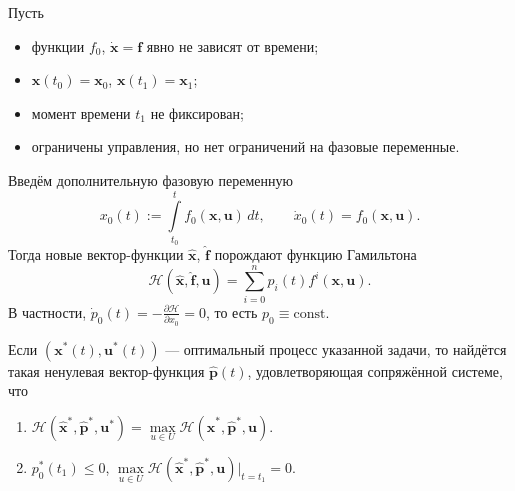 Пусть 
\begin{itemize}[label=--]
  \item функции $ f_0 $, $ \dot{\mathbf{x}} = \mathbf{f} $ явно не зависят от
времени; 
\item $ \mathbf{x}(t_0) = \mathbf{x}_0 $, $ \mathbf{x}(t_1) = \mathbf{x}_1 $; 
\item момент времени $ t_1 $ не фиксирован;
 \item ограничены управления, но нет ограничений на фазовые переменные.
\end{itemize}

Введём дополнительную фазовую переменную  
\[
  x_0(t) := \int\limits_{t_0}^{t}f_0(\mathbf{x}, \mathbf{u})\,dt, \qquad
  \dot{x}_0(t) = f_0(\mathbf{x}, \mathbf{u}).
\]
Тогда новые вектор-функции $ \hat{\mathbf{x}} $, $ \hat{\mathbf{f}} $ порождают
функцию Гамильтона  
\[
  \mathscr{H}(\hat{\mathbf{x}}, \hat{\mathbf{f}}, \mathbf{u}) = \sum_{i=0}^n
  p_i(t)f^i(\mathbf{x}, \mathbf{u}).
\]
В частности, $ \dot{p}_0(t) = -\frac{\partial \mathscr H}{\partial x_0} = 0 $, то
есть $ p_0 \equiv \mathrm{const} $.


\begin{theorem}
  Если $ (\mathbf{x}^\ast(t), \mathbf{u}^{\ast}(t)) $ --- оптимальный процесс
  указанной задачи, то найдётся такая ненулевая вектор-функция $
  \hat{\mathbf{p}}(t) $, удовлетворяющая сопряжённой системе, что 
  \begin{enumerate}
    \item $ \mathscr H(\hat{\mathbf{x}}^{\ast}, \hat{\mathbf{p}}^{\ast},
      \mathbf{u}^\ast) = \max\limits_{u\in U} \mathscr H(\hat{\mathbf{x}}^\ast,
      \hat{\mathbf{p}}^\ast, \mathbf{u}) $.
    \item $ p_0^\ast(t_1) \leqslant 0 $, $ \max\limits_{u\in U} \mathscr H(\hat{\mathbf{x}}^\ast,
      \hat{\mathbf{p}}^\ast, \mathbf{u})\bigr|_{t=t_1} = 0 $.
  \end{enumerate}
\end{theorem}

